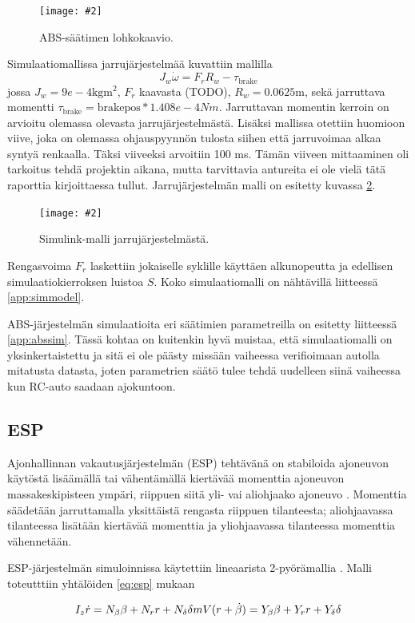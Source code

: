 \documentclass{article}
\newcommand{\kuvaa}[4]{%
	\begin{figure}[h]%
		\centering \texttt{[image: \#2]}%
		\caption{#3 \label{fig:#4}}%
	\end{figure}%
}
\begin{document}
\kuvaa{0.8}{mdl}{ABS-säätimen lohkokaavio.}{absmdl}

Simulaatiomallissa jarrujärjestelmää kuvattiin mallilla
\[
	J_w \dot \omega = F_r R_w - \tau_\text{brake}
\]
jossa $J_w = 9e-4 \text{kg} \text{m}^2$, $F_r$ kaavasta (TODO), $R_w = 0.0625 \text{m}$, sekä jarruttava momentti $\tau_\text{brake} = \text{brakepos} * 1.408e-4 Nm$. Jarruttavan momentin kerroin on arvioitu olemassa olevasta jarrujärjestelmästä. Lisäksi mallissa otettiin huomioon viive, joka on olemassa ohjauspyynnön tulosta siihen että jarruvoimaa alkaa syntyä renkaalla. Täksi viiveeksi arvoitiin 100 ms. Tämän viiveen mittaaminen oli tarkoitus tehdä projektin aikana, mutta tarvittavia antureita ei ole vielä tätä raporttia kirjoittaessa tullut. Jarrujärjestelmän malli on esitetty kuvassa \ref{fig:brakemdl}.

\kuvaa{0.8}{brakeMdl}{Simulink-malli jarrujärjestelmästä.}{brakemdl}

Rengasvoima $F_r$ laskettiin jokaiselle syklille käyttäen alkunopeutta ja edellisen simulaatiokierroksen luistoa $S$. Koko simulaatiomalli on nähtävillä liitteessä \ref{app:simmodel}.

ABS-järjestelmän simulaatioita eri säätimien parametreilla on esitetty liitteessä \ref{app:abssim}. Tässä kohtaa on kuitenkin hyvä muistaa, että simulaatiomalli on yksinkertaistettu ja sitä ei ole päästy missään vaiheessa verifioimaan autolla mitatusta datasta, joten parametrien säätö tulee tehdä uudelleen siinä vaiheessa kun RC-auto saadaan ajokuntoon.

\subsection{ESP}
Ajonhallinnan vakautusjärjestelmän (ESP) tehtävänä on stabiloida ajoneuvon käytöstä lisäämällä tai vähentämällä kiertävää momenttia ajoneuvon massakeskipisteen ympäri, riippuen siitä yli- vai aliohjaako ajoneuvo \cite{bib:bosch}. Momenttia säädetään jarruttamalla yksittäistä rengasta riippuen tilanteesta; aliohjaavassa tilanteessa lisätään kiertävää momenttia ja yliohjaavassa tilanteessa momenttia vähennetään.

ESP-järjestelmän simuloinnissa käytettiin lineaarista 2-pyörämallia \cite{bib:milliken}. Malli toteutttiin yhtälöiden \ref{eq:esp} mukaan

\begin{equation} \label{eq:esp}
I_z \dot r = N_\beta \beta + N_r r + N_\delta \delta \\
mV(r + \dot \beta) = Y_\beta \beta + Y_r r + Y_\delta \delta
\end{equation}
\end{document}
